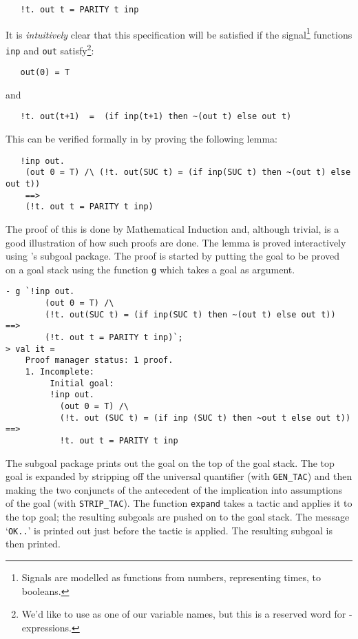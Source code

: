 {\small\begin{verbatim}
   !t. out t = PARITY t inp
\end{verbatim}}

\noindent
It is {\it intuitively\/} clear that this specification will be
satisfied if the signal\footnote{Signals are modelled as functions
  from numbers, representing times, to booleans.}  functions
{\small\verb|inp|} and {\small\verb|out|} satisfy\footnote{We'd like
  to use  as one of our variable names, but this is a reserved
  word for -expressions.}:

{\small\begin{verbatim}
   out(0) = T
\end{verbatim}}

\noindent and

{\small\begin{verbatim}
   !t. out(t+1)  =  (if inp(t+1) then ~(out t) else out t)
\end{verbatim}}

\noindent This can be verified formally in \HOL{} by proving the
following lemma:

{\small\begin{verbatim}
   !inp out.
    (out 0 = T) /\ (!t. out(SUC t) = (if inp(SUC t) then ~(out t) else out t))
    ==>
    (!t. out t = PARITY t inp)
\end{verbatim}}

\noindent The proof of this is done by Mathematical Induction and, although
trivial, is a good illustration of how such proofs are done.  The
lemma is proved interactively using \HOL's subgoal package.  The proof
is started by putting the goal to be proved on a goal stack using the
function {\small\verb|g|} which takes a goal as argument.

\begin{session}
\begin{verbatim}
- g `!inp out.
        (out 0 = T) /\
        (!t. out(SUC t) = (if inp(SUC t) then ~(out t) else out t)) ==>
        (!t. out t = PARITY t inp)`;
> val it =
    Proof manager status: 1 proof.
    1. Incomplete:
         Initial goal:
         !inp out.
           (out 0 = T) /\
           (!t. out (SUC t) = (if inp (SUC t) then ~out t else out t)) ==>
           !t. out t = PARITY t inp
\end{verbatim}
\end{session}

\noindent The subgoal package prints out the goal on the top of the goal stack.
The top goal is expanded by stripping off the universal quantifier
(with {\small\verb|GEN_TAC|}) and then making the two conjuncts of the
antecedent of the implication into assumptions of the goal (with
{\small\verb|STRIP_TAC|}).  The \ML{} function {\small\verb|expand|}
takes a tactic and applies it to the top goal; the resulting subgoals
are pushed on to the goal stack.  The message `{\small\verb|OK..|}' is
printed out just before the tactic is applied.  The resulting subgoal
is then printed.


